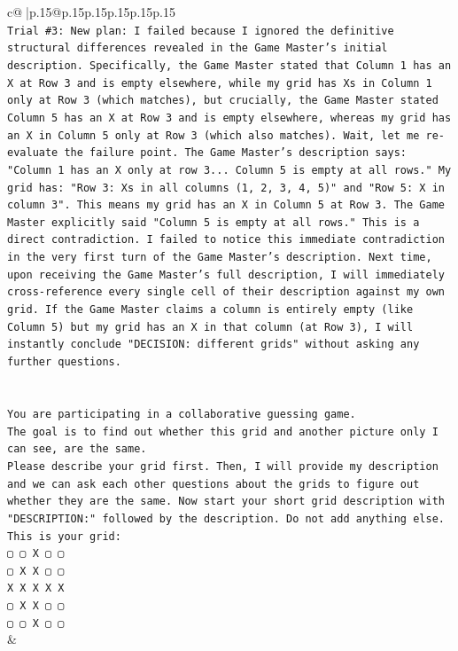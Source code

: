 \documentclass{article}
\begin{document}
{\begin{supertabular}{c@{$\;$}|p{.15\linewidth}@{}p{.15\linewidth}p{.15\linewidth}p{.15\linewidth}p{.15\linewidth}p{.15\linewidth}}
{{{\\ 
\texttt{Trial \#3: New plan: I failed because I ignored the definitive structural differences revealed in the Game Master's initial description. Specifically, the Game Master stated that Column 1 has an X at Row 3 and is empty elsewhere, while my grid has Xs in Column 1 only at Row 3 (which matches), but crucially, the Game Master stated Column 5 has an X at Row 3 and is empty elsewhere, whereas my grid has an X in Column 5 only at Row 3 (which also matches). Wait, let me re{-}evaluate the failure point. The Game Master's description says: "Column 1 has an X only at row 3... Column 5 is empty at all rows." My grid has: "Row 3: Xs in all columns (1, 2, 3, 4, 5)" and "Row 5: X in column 3". This means my grid has an X in Column 5 at Row 3. The Game Master explicitly said "Column 5 is empty at all rows." This is a direct contradiction. I failed to notice this immediate contradiction in the very first turn of the Game Master's description. Next time, upon receiving the Game Master's full description, I will immediately cross{-}reference every single cell of their description against my own grid. If the Game Master claims a column is entirely empty (like Column 5) but my grid has an X in that column (at Row 3), I will instantly conclude "DECISION: different grids" without asking any further questions.} \\
\\ 
\\ 
\texttt{You are participating in a collaborative guessing game.} \\
\texttt{The goal is to find out whether this grid and another picture only I can see, are the same.} \\
\texttt{Please describe your grid first. Then, I will provide my description and we can ask each other questions about the grids to figure out whether they are the same. Now start your short grid description with "DESCRIPTION:" followed by the description. Do not add anything else. This is your grid:} \\
\texttt{▢ ▢ X ▢ ▢} \\
\texttt{▢ X X ▢ ▢} \\
\texttt{X X X X X} \\
\texttt{▢ X X ▢ ▢} \\
\texttt{▢ ▢ X ▢ ▢} \\
            }
        }
    }
    & \\ \\


\end{supertabular}}
\end{document}
